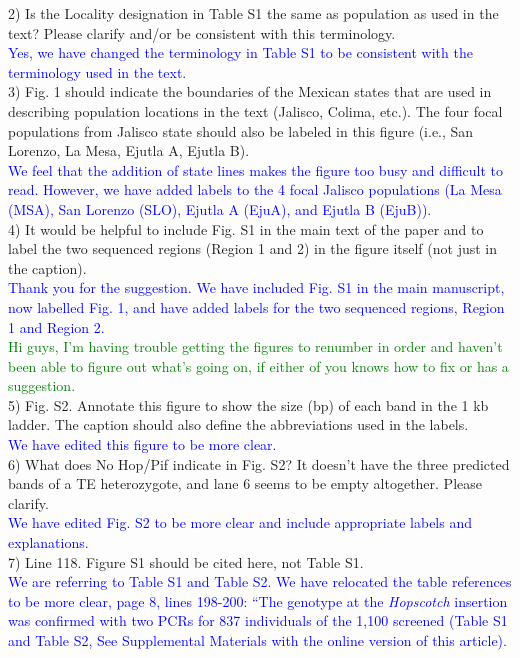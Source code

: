 \documentclass[11pt]{article}
\newcommand{\res}[1]{\noindent \textcolor{blue}{{#1}} \\}
\newcommand{\lev}[1]{\noindent \textcolor{green}{{#1}} \\}
\begin{document}
2) Is the Locality designation in Table S1 the same as population as used in the text? Please clarify and/or be consistent with this terminology.\\

\res{Yes, we have changed the terminology in Table S1 to be consistent with the terminology used in the text.}

3) Fig. 1 should indicate the boundaries of the Mexican states that are used in describing population locations in the text (Jalisco, Colima, etc.). The four focal populations from Jalisco state should also be labeled in this figure (i.e., San Lorenzo, La Mesa, Ejutla A, Ejutla B).\\

\res{We feel that the addition of state lines makes the figure too busy and difficult to read. However, we have added labels to the 4 focal Jalisco populations (La Mesa (MSA), San Lorenzo (SLO), Ejutla A (EjuA), and Ejutla B (EjuB)).}

4) It would be helpful to include Fig. S1 in the main text of the paper and to label the two sequenced regions (Region 1 and 2) in the figure itself (not just in the caption). \\

\res{Thank you for the suggestion. We have included Fig. S1 in the main manuscript, now labelled Fig. 1, and have added labels for the two sequenced regions, Region 1 and Region 2.}

\lev{Hi guys, I'm having trouble getting the figures to renumber in order and haven't been able to figure out what's going on, if either of you knows how to fix or has a suggestion.}

5) Fig. S2. Annotate this figure to show the size (bp) of each band in the 1 kb ladder. The caption should also define the abbreviations used in the labels. \\

\res{We have edited this figure to be more clear.}

6) What does No Hop/Pif indicate in Fig. S2? It doesn't have the three predicted bands of a TE heterozygote, and lane 6 seems to be empty altogether. Please clarify. \\

\res{We have edited Fig. S2 to be more clear and include appropriate labels and explanations.}

7) Line 118. Figure S1 should be cited here, not Table S1. \\

\res{We are referring to Table S1 and Table S2. We have relocated the table references to be more clear, page 8, lines 198-200: ``The genotype at the \emph{Hopscotch} insertion was confirmed with two PCRs for 837 individuals of the 1,100 screened (Table S1 and Table S2, See Supplemental Materials with the online version of this article).}
\end{document}
